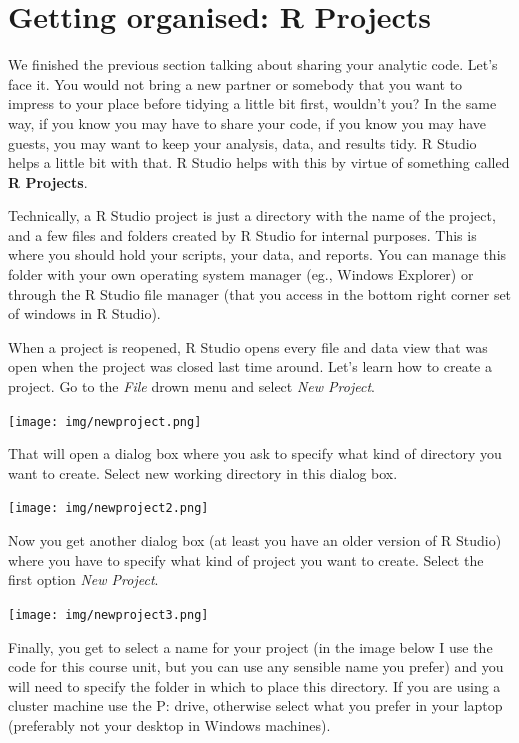 \documentclass[]{book}
\begin{document}
\hypertarget{getting-organised-r-projects}{%
\section{Getting organised: R Projects}\label{getting-organised-r-projects}}

We finished the previous section talking about sharing your analytic code. Let's face it. You would not bring a new partner or somebody that you want to impress to your place before tidying a little bit first, wouldn't you? In the same way, if you know you may have to share your code, if you know you may have guests, you may want to keep your analysis, data, and results tidy. R Studio helps a little bit with that. R Studio helps with this by virtue of something called \textbf{R Projects}.

Technically, a R Studio project is just a directory with the name of the project, and a few files and folders created by R Studio for internal purposes. This is where you should hold your scripts, your data, and reports. You can manage this folder with your own operating system manager (eg., Windows Explorer) or through the R Studio file manager (that you access in the bottom right corner set of windows in R Studio).

When a project is reopened, R Studio opens every file and data view that was open when the project was closed last time around. Let's learn how to create a project. Go to the \emph{File} drown menu and select \emph{New Project}.

\texttt{[image: img/newproject.png]}

That will open a dialog box where you ask to specify what kind of directory you want to create. Select new working directory in this dialog box.

\texttt{[image: img/newproject2.png]}

Now you get another dialog box (at least you have an older version of R Studio) where you have to specify what kind of project you want to create. Select the first option \emph{New Project}.

\texttt{[image: img/newproject3.png]}

Finally, you get to select a name for your project (in the image below I use the code for this course unit, but you can use any sensible name you prefer) and you will need to specify the folder in which to place this directory. If you are using a cluster machine use the P: drive, otherwise select what you prefer in your laptop (preferably not your desktop in Windows machines).
\end{document}
